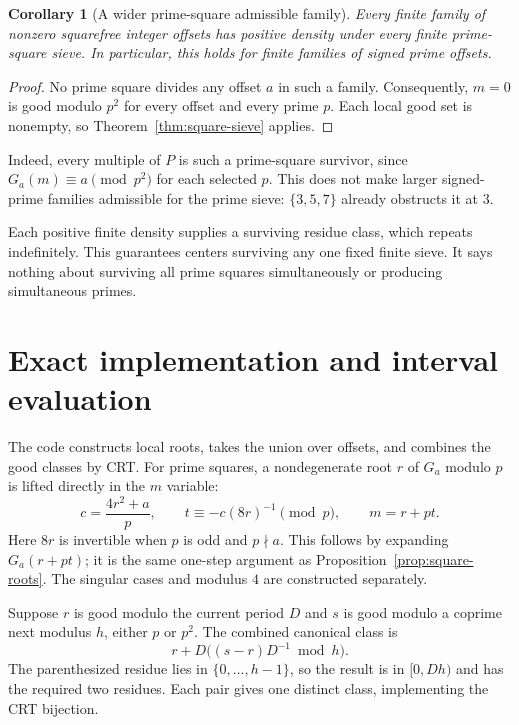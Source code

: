 \documentclass[11pt]{article}
\newtheorem{corollary}[theorem]{Corollary}
\theoremstyle{definition}
\theoremstyle{remark}
\begin{document}
\begin{corollary}[A wider prime-square admissible family]\label{cor:family}
Every finite family of nonzero squarefree integer offsets has positive
density under every finite prime-square sieve. In particular, this
holds for finite families of signed prime offsets.
\end{corollary}
\begin{proof}
No prime square divides any offset $a$ in such a family. Consequently,
$m=0$ is good modulo $p^2$ for every offset and every prime $p$.
Each local good set is nonempty, so Theorem~\ref{thm:square-sieve} applies.
\end{proof}

Indeed, every multiple of $P$ is such a prime-square survivor,
since $G_a(m)\equiv a\pmod{p^2}$ for each selected $p$.
This does not make larger signed-prime families
admissible for the prime sieve: $\{3,5,7\}$ already obstructs it at $3$.

Each positive finite density supplies a surviving residue class,
which repeats indefinitely. This guarantees centers surviving any
one fixed finite sieve. It says nothing about surviving all prime
squares simultaneously or producing simultaneous primes.

\section{Exact implementation and interval evaluation}
The code constructs local roots, takes the union over offsets,
and combines the good classes by CRT. For prime squares, a
nondegenerate root $r$ of $G_a$ modulo $p$ is lifted directly in
the $m$ variable:
\[
 c=\frac{4r^2+a}{p},\qquad
 t\equiv-c(8r)^{-1}\pmod p,\qquad m=r+pt.
\]
Here $8r$ is invertible when $p$ is odd and $p\nmid a$.
This follows by expanding $G_a(r+pt)$; it is the same one-step
argument as Proposition~\ref{prop:square-roots}. The singular cases
and modulus $4$ are constructed separately.

Suppose $r$ is good modulo the current period $D$ and $s$ is good
modulo a coprime next modulus $h$, either $p$ or $p^2$. The combined
canonical class is
\[
 r+D\big((s-r)D^{-1}\bmod h\big).
\]
The parenthesized residue lies in $\{0,\ldots,h-1\}$, so the result
is in $[0,Dh)$ and has the required two residues. Each pair gives
one distinct class, implementing the CRT bijection.
\end{document}
